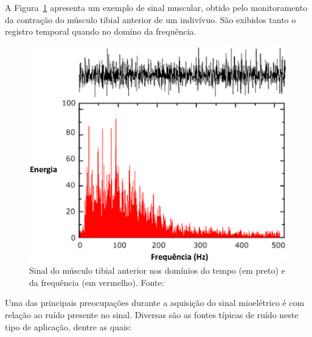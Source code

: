 \documentclass[a4paper,11pt]{article}
\begin{document}
A Figura~\ref{fig:fft_emg} apresenta um exemplo de sinal muscular, obtido pelo monitoramento da contração do músculo tibial anterior de um indivívuo. São exibidos tanto o registro temporal quando no domíno da  frequência.

\begin{figure}[h]
  \centering
  \includegraphics[scale=0.25]{fig/fft_emg.eps}
	\caption {Sinal do músculo tibial anterior nos domínios do tempo (em preto) e da frequência (em vermelho). Fonte:~\parencite{DELUCA2002}}
  \label{fig:fft_emg}
\end{figure}

Uma das principais preocupações durante a aquisição do sinal mioelétrico é com relação ao ruído presente no sinal. Diversas são as fontes típicas de ruído neste tipo de aplicação, dentre as quais:
\end{document}
